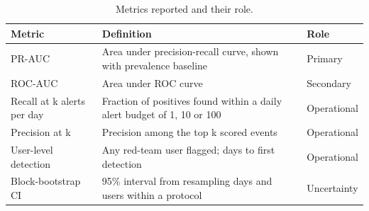 \begin{table}[t]
\centering\small
\caption{Metrics reported and their role.}
\begin{tabular}{lp{3.2cm}p{3.2cm}}
\toprule
Metric & Definition & Role \\
\midrule
PR-AUC & Area under precision-recall curve, shown with prevalence baseline & Primary \\
ROC-AUC & Area under ROC curve & Secondary \\
Recall at k alerts per day & Fraction of positives found within a daily alert budget of 1, 10 or 100 & Operational \\
Precision at k & Precision among the top k scored events & Operational \\
User-level detection & Any red-team user flagged; days to first detection & Operational \\
Block-bootstrap CI & 95\% interval from resampling days and users within a protocol & Uncertainty \\
\bottomrule
\end{tabular}
\label{tab:metric_definitions}
\end{table}
